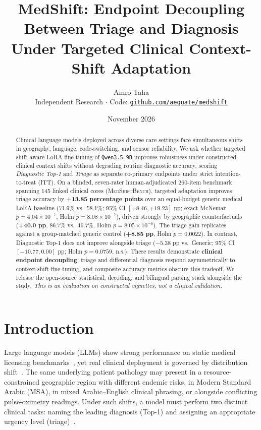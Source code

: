 \documentclass[10pt,twocolumn]{article}
\title{\vspace{-1.2em}\textbf{MedShift: Endpoint Decoupling Between Triage and Diagnosis Under Targeted Clinical Context-Shift Adaptation}}
\author{Amro Taha\\
\small Independent Research \quad $\cdot$ \quad Code: \href{https://github.com/aequate/medshift}{\texttt{github.com/aequate/medshift}}}
\date{\vspace{-0.5em}\small November 2026}
\begin{document}
\maketitle

\begin{abstract}
\noindent Clinical language models deployed across diverse care settings face simultaneous shifts in geography, language, code-switching, and sensor reliability. We ask whether targeted shift-aware LoRA fine-tuning of \texttt{Qwen3.5-9B} improves robustness under constructed clinical context shifts without degrading routine diagnostic accuracy, scoring \emph{Diagnostic Top-1} and \emph{Triage} as separate co-primary endpoints under strict intention-to-treat (ITT). On a blinded, seven-rater human-adjudicated 260-item benchmark spanning 145 linked clinical cores (\textsc{MedShiftBench}), targeted adaptation improves triage accuracy by \textbf{+13.85 percentage points} over an equal-budget generic medical LoRA baseline (71.9\% vs.\ 58.1\%; 95\% CI $[+8.46, +19.23]$ pp; exact McNemar $p = 4.04\times 10^{-7}$, Holm $p = 8.08\times 10^{-7}$), driven strongly by geographic counterfactuals (\textbf{+40.0 pp}, 86.7\% vs.\ 46.7\%, Holm $p = 8.05\times 10^{-6}$). The triage gain replicates against a group-matched generic control (\textbf{+8.85 pp}, Holm $p = 0.0022$). In contrast, Diagnostic Top-1 does not improve alongside triage ($-5.38$ pp vs.\ Generic; 95\% CI $[-10.77, 0.00]$ pp; Holm $p = 0.0759$, n.s.). These results demonstrate \textbf{clinical endpoint decoupling}: triage and differential diagnosis respond asymmetrically to context-shift fine-tuning, and composite accuracy metrics obscure this tradeoff. We release the open-source statistical, decoding, and bilingual parsing stack alongside the study. \emph{This is an evaluation on constructed vignettes, not a clinical validation.}
\end{abstract}

\section{Introduction}
Large language models (LLMs) show strong performance on static medical licensing benchmarks~\cite{singhal2023medpalm}, yet real clinical deployment is governed by distribution shift~\cite{quionero2009datasetshift,subbaswamy2020deployment,koh2021wilds}. The same underlying patient pathology may present in a resource-constrained geographic region with different endemic risks, in Modern Standard Arabic (MSA), in mixed Arabic--English clinical phrasing, or alongside conflicting pulse-oximetry readings. Under such shifts, a model must perform two distinct clinical tasks: naming the leading diagnosis (Top-1) and assigning an appropriate urgency level (triage)~\cite{nasem2015diagnosis}.
\end{document}
